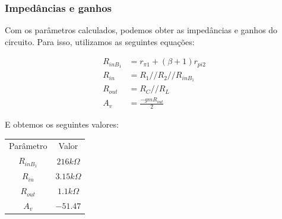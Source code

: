 \subsubsection{Impedâncias e ganhos}

Com os parâmetros calculados, podemos obter as impedâncias e ganhos do circuito. Para isso, utilizamos as seguintes equações:

\begin{equation}
    \begin{aligned}
        R_{inB_1} & = r_{\pi 1} + (\beta + 1) r_{pi2} \\
        R_{in}    & = R_1 // R_2 // R_{inB_1}         \\
        R_{out}   & = R_C // R_L                      \\
        A_v       & = \frac{-gm R_{out}}{2}
    \end{aligned}
\end{equation}

E obtemos os seguintes valores:

\begin{center}
    \begin{tabular}{ |c|c| }
        \hline
        Parâmetro   & Valor              \\
        $R_{inB_1}$ & $216 k \varOmega$  \\
        $R_{in}$    & $3.15 k \varOmega$ \\
        $R_{out}$   & $1.1k \varOmega$   \\
        $A_v$       & $-51.47$           \\
        \hline
    \end{tabular}
\end{center}
